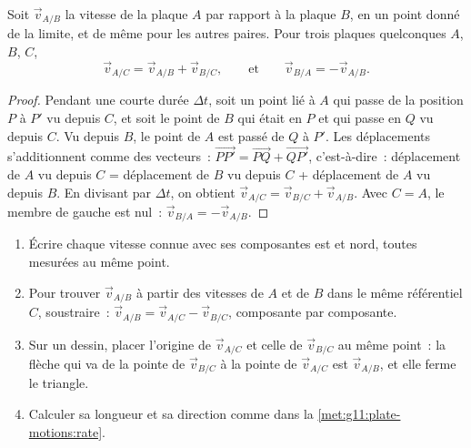 \begin{proposition}\label{prop:g11:plate-motions:sum}
Soit $\vec v_{A/B}$ la vitesse de la plaque $A$ par rapport à la plaque $B$,
en un point donné de la limite, et de même pour les autres paires. Pour
trois plaques quelconques $A$, $B$, $C$,
\[
  \vec v_{A/C} = \vec v_{A/B} + \vec v_{B/C},
  \qquad\text{et}\qquad
  \vec v_{B/A} = -\vec v_{A/B}.
\]
\end{proposition}

\begin{proof}
Pendant une courte durée $\Delta t$, soit un point lié à $A$ qui passe de la
position $P$ à $P'$ vu depuis $C$, et soit le point de $B$ qui était en $P$
et qui passe en $Q$ vu depuis $C$. Vu depuis $B$, le point de $A$ est passé
de $Q$ à $P'$. Les déplacements s'additionnent comme des vecteurs~:
$\overrightarrow{PP'} = \overrightarrow{PQ} + \overrightarrow{QP'}$,
c'est-à-dire~: déplacement de $A$ vu depuis $C$ = déplacement de $B$ vu
depuis $C$ + déplacement de $A$ vu depuis $B$. En divisant par $\Delta t$,
on obtient $\vec v_{A/C}
= \vec v_{B/C} + \vec v_{A/B}$. Avec $C = A$, le membre de gauche est
nul~: $\vec
v_{B/A} = -\vec v_{A/B}$.
\end{proof}

\begin{method}\label{met:g11:plate-motions:triangle}
\begin{enumerate}
  \item Écrire chaque vitesse connue avec ses composantes est et nord,
        toutes mesurées au même point.
  \item Pour trouver $\vec v_{A/B}$ à partir des vitesses de $A$ et de $B$
        dans le même référentiel $C$, soustraire~: $\vec v_{A/B} = \vec v_{A/C} - \vec v_{B/C}$,
        composante par composante.
  \item Sur un dessin, placer l'origine de $\vec v_{A/C}$ et celle de
        $\vec v_{B/C}$ au même point~: la flèche qui va de la pointe de
        $\vec v_{B/C}$ à la pointe de $\vec v_{A/C}$ est $\vec v_{A/B}$, et
        elle ferme le triangle.
  \item Calculer sa longueur et sa direction comme dans la
        \cref{met:g11:plate-motions:rate}.
\end{enumerate}
\end{method}


